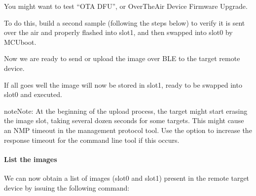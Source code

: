 \documentclass[letterpaper,10pt,english]{sphinxmanual}
\begin{document}
You might want to test “OTA DFU”, or Over\sphinxhyphen{}The\sphinxhyphen{}Air Device Firmware Upgrade.

To do this, build a second sample (following the steps below) to verify
it is sent over the air and properly flashed into slot\sphinxhyphen{}1, and then
swapped into slot\sphinxhyphen{}0 by MCUboot.

\begin{sphinxVerbatim}[commandchars=\\\{\}]
    
    
     
\end{sphinxVerbatim}

Now we are ready to send or upload the image over BLE to the target remote
device.

\begin{sphinxVerbatim}[commandchars=\\\{\}]
\end{sphinxVerbatim}

If all goes well the image will now be stored in slot\sphinxhyphen{}1, ready to be swapped
into slot\sphinxhyphen{}0 and executed.

\begin{sphinxadmonition}{note}{Note:}
At the beginning of the upload process, the target might start erasing
the image slot, taking several dozen seconds for some targets.  This might
cause an NMP timeout in the management protocol tool. Use the
 option to increase the response timeout for the
 command line tool if this occurs.
\end{sphinxadmonition}


\paragraph{List the images}
\label{\detokenize{fota/smp_svr:list-the-images}}
We can now obtain a list of images (slot\sphinxhyphen{}0 and slot\sphinxhyphen{}1) present in the remote
target device by issuing the following command:

\begin{sphinxVerbatim}[commandchars=\\\{\}]
\end{sphinxVerbatim}
\end{document}
